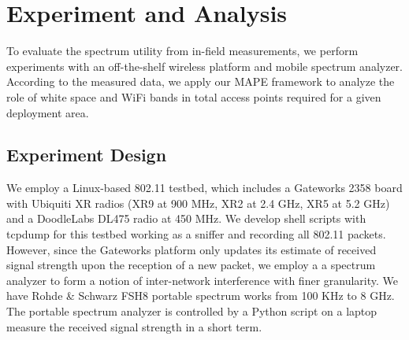 \section{Experiment and Analysis}
\label{sec:experimentdesign}
To evaluate the spectrum utility from in-field measurements, we perform experiments 
with an off-the-shelf wireless platform and mobile spectrum analyzer.
According to the measured data, we apply our MAPE framework to analyze the role
of white space and WiFi bands in total access points required for a given deployment area.

\subsection{Experiment Design}
We employ a Linux-based 802.11 testbed, which includes a Gateworks 2358 board with 
Ubiquiti XR radios (XR9 at 900 MHz, XR2 at 2.4 GHz, XR5 at 5.2 GHz) and a DoodleLabs DL475 
radio at 450 MHz.  We develop shell scripts with tcpdump for this testbed working as a sniffer 
and recording all 802.11 packets. However, since the Gateworks platform only updates its
estimate of received signal strength upon the reception of a new packet, we employ a
a spectrum analyzer to form a notion of inter-network interference with finer granularity.
We have Rohde \& Schwarz FSH8 portable spectrum works from 100 KHz to 8 GHz. The portable spectrum
analyzer is controlled by a Python script on a laptop measure the received signal strength 
in a short term. 

